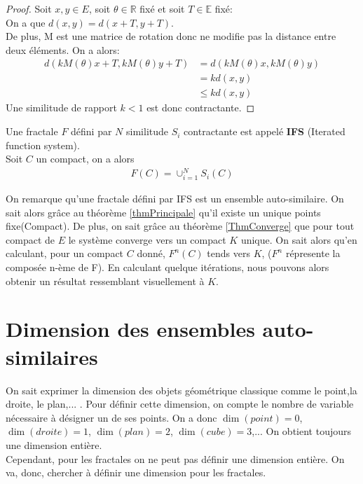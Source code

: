 \documentclass[a4paper, 12pt]{report}
\begin{document}
			\begin{proof}
				Soit $x,y\in E$, soit $\theta\in\mathds{R}$ fixé et soit $T\in\mathds{E}$ fixé:\\
				On a que $d(x,y)=d(x+T,y+T)$.\\
				De plus, M est une matrice de rotation donc ne modifie pas la distance entre deux éléments. On a alors:
				\begin{align*}
					d(kM(\theta)x+T,kM(\theta)y+T)	&=d(kM(\theta)x,kM(\theta)y)\\
													&=kd(x,y)\\
													&\leq kd(x,y)
				\end{align*}
				Une similitude de rapport $k<1$ est donc contractante.
			\end{proof}



			\begin{definition}
				Une fractale $F$ défini par $N$ similitude $S_i$ contractante est appelé \textbf{IFS} (Iterated function system).\\
				Soit $C$ un compact, on a alors
				\begin{align*}
					F(C)=\cup^N_{i=1}S_i(C)
				\end{align*}

			\end{definition}
			
			\hspace{.7 cm}On remarque qu'une fractale défini par IFS est un ensemble auto-similaire. On sait alors grâce au théorème \ref{thmPrincipale} qu'il existe un unique points fixe(Compact). De plus, on sait grâce au théorème \ref{ThmConverge} que pour tout compact de $E$ le système converge vers un compact $K$ unique. On sait alors qu'en calculant, pour un compact $C$ donné, $F^n(C)$ tends vers $K$, ($F^n$ répresente la composée n-ème de F). En calculant quelque itérations, nous pouvons alors obtenir un résultat ressemblant visuellement à $K$.

	\chapter{\bf Dimension des ensembles auto-similaires}
		On sait exprimer la dimension des objets géométrique classique comme le point,la droite, le plan,... . Pour définir cette dimension, on compte le nombre de variable nécessaire à désigner un de ses points. On a donc $\dim(point)=0$, $\dim(droite)=1$, $\dim(plan)=2$, $\dim(cube)=3$,... On obtient toujours une dimension entière.\\
		Cependant, pour les fractales on ne peut pas définir une dimension entière. On va, donc, chercher à définir une dimension pour les fractales.
\end{document}
